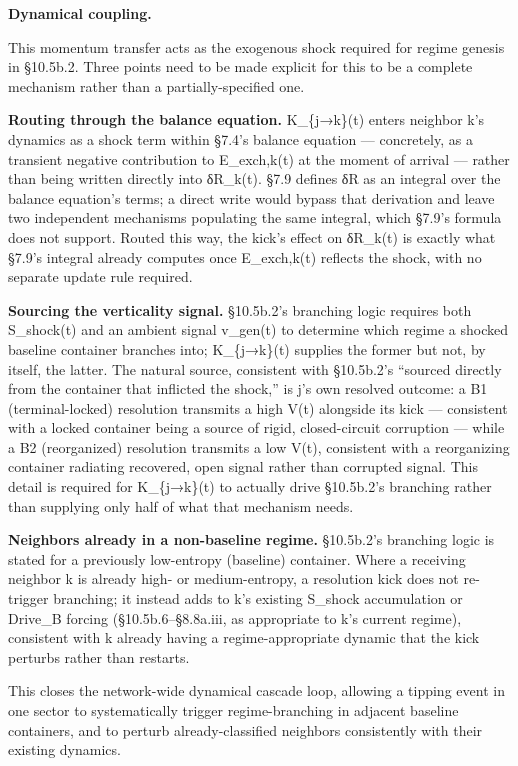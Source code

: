 \documentclass[
]{article}
\begin{document}
\textbf{Dynamical coupling.}

This momentum transfer acts as the exogenous shock required for regime
genesis in §10.5b.2. Three points need to be made explicit for this to
be a complete mechanism rather than a partially-specified one.

\textbf{Routing through the balance equation.} K\_\{j→k\}(t) enters
neighbor k's dynamics as a shock term within §7.4's balance equation ---
concretely, as a transient negative contribution to E\_exch,k(t) at the
moment of arrival --- rather than being written directly into δR\_k(t).
§7.9 defines δR as an integral over the balance equation's terms; a
direct write would bypass that derivation and leave two independent
mechanisms populating the same integral, which §7.9's formula does not
support. Routed this way, the kick's effect on δR\_k(t) is exactly what
§7.9's integral already computes once E\_exch,k(t) reflects the shock,
with no separate update rule required.

\textbf{Sourcing the verticality signal.} §10.5b.2's branching logic
requires both S\_shock(t) and an ambient signal v\_gen(t) to determine
which regime a shocked baseline container branches into; K\_\{j→k\}(t)
supplies the former but not, by itself, the latter. The natural source,
consistent with §10.5b.2's ``sourced directly from the container that
inflicted the shock,'' is j's own resolved outcome: a B1
(terminal-locked) resolution transmits a high V(t) alongside its kick
--- consistent with a locked container being a source of rigid,
closed-circuit corruption --- while a B2 (reorganized) resolution
transmits a low V(t), consistent with a reorganizing container radiating
recovered, open signal rather than corrupted signal. This detail is
required for K\_\{j→k\}(t) to actually drive §10.5b.2's branching rather
than supplying only half of what that mechanism needs.

\textbf{Neighbors already in a non-baseline regime.} §10.5b.2's
branching logic is stated for a previously low-entropy (baseline)
container. Where a receiving neighbor k is already high- or
medium-entropy, a resolution kick does not re-trigger branching; it
instead adds to k's existing S\_shock accumulation or Drive\_B forcing
(§10.5b.6--§8.8a.iii, as appropriate to k's current regime), consistent
with k already having a regime-appropriate dynamic that the kick
perturbs rather than restarts.

This closes the network-wide dynamical cascade loop, allowing a tipping
event in one sector to systematically trigger regime-branching in
adjacent baseline containers, and to perturb already-classified
neighbors consistently with their existing dynamics.
\end{document}
